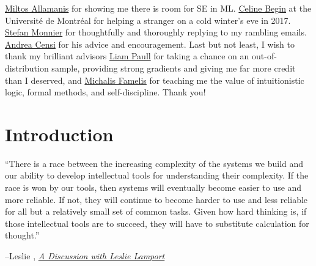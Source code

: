 \documentclass[12pt,initial,twoside,maitrise]{dms}
\numberwithin{equation}{section}
\numberwithin{table}{chapter}
\numberwithin{figure}{chapter}
\begin{document}
\href{https://miltos.allamanis.com/}{Miltos Allamanis} for showing me there is room for SE in ML. \href{https://diro.umontreal.ca/accueil/}{Celine Begin} at the Universit\'e de Montr\'eal for helping a stranger on a cold winter's eve in 2017. \href{https://www.iro.umontreal.ca/~monnier/}{Stefan Monnier} for thoughtfully and thoroughly replying to my rambling emails. \href{https://censi.science/}{Andrea Censi} for his advice and encouragement. Last but not least, I wish to thank my brilliant advisors \href{http://liampaull.ca/}{Liam Paull} for taking a chance on an out-of-distribution sample, providing strong gradients and giving me far more credit than I deserved, and \href{https://michalis.famelis.info/}{Michalis Famelis} for teaching me the value of intuitionistic logic, formal methods, and self-discipline. Thank you!


\cleardoublepage
{}  %
\tableofcontents
\cleardoublepage
\listoftables
\cleardoublepage
\listoffigures

\NoChapterPageNumber
\cleardoublepage
{}

\chapter{Introduction}\label{ch:introduction}

\setlength{\epigraphwidth}{0.85\textwidth}
\epigraph{``There is a race between the increasing complexity of the systems we build and our ability to develop intellectual tools for understanding their complexity. If the race is won by our tools, then systems will eventually become easier to use and more reliable. If not, they will continue to become harder to use and less reliable for all but a relatively small set of common tasks. Given how hard thinking is, if those intellectual tools are to succeed, they will have to substitute calculation for thought.''}{\begin{flushright}--Leslie \citet{lamport2002discussion}, \href{https://www.microsoft.com/en-us/research/uploads/prod/2016/12/A-Discussion-With-Leslie-Lamport.pdf}{\textit{A Discussion with Leslie Lamport}}\end{flushright}}
\end{document}
